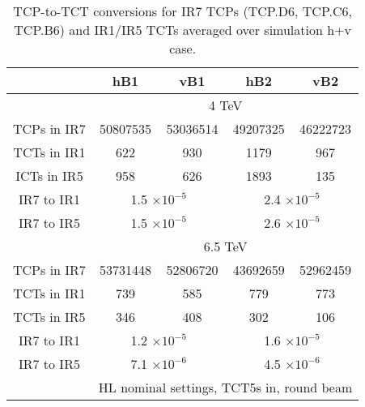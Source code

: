 \begin{table}
   \centering
   \caption{TCP-to-TCT conversions for IR7 TCPs (\textsc{TCP.D6, TCP.C6, TCP.B6}) and IR1/IR5 TCTs averaged over simulation h+v case.}

   \begin{tabular}{c|cc|cc}

       & hB1 & vB1 & hB2 & vB2\\ \hline       
       & \multicolumn{4}{c}{4 TeV} \\   %
       TCPs in IR7 & 50807535 & 53036514 & 49207325 & 46222723 \\
       TCTs in IR1 & 622 & 930 & 1179 & 967 \\
       ICTs in IR5 & 958 & 626 & 1893 & 135 \\ %
       IR7 to IR1  & \multicolumn{2}{c|}{1.5 $\times 10^{-5}$} & \multicolumn{2}{c}{2.4 $\times 10^{-5}$ } \\
       IR7 to IR5  & \multicolumn{2}{c|}{1.5 $\times 10^{-5}$} & \multicolumn{2}{c}{2.6 $\times 10^{-5}$ } \\
       \hline
       & \multicolumn{4}{c}{6.5 TeV} \\      
       TCPs in IR7 & 53731448 & 52806720 & 43692659 & 52962459 \\
       TCTs in IR1 & 739 & 585 & 779 & 773 \\
       TCTs in IR5 & 346 & 408 & 302 & 106 \\%
       IR7 to IR1 &  \multicolumn{2}{c|}{1.2 $\times 10^{-5}$} &  \multicolumn{2}{c}{1.6 $\times 10^{-5}$ } \\
       IR7 to IR5 &  \multicolumn{2}{c|}{7.1 $\times 10^{-6}$} &  \multicolumn{2}{c}{4.5 $\times 10^{-6}$ } \\
       \hline       
       & \multicolumn{4}{c}{HL nominal settings, TCT5s in, round beam}  \\ %
       

\end{tabular}
\end{table}
